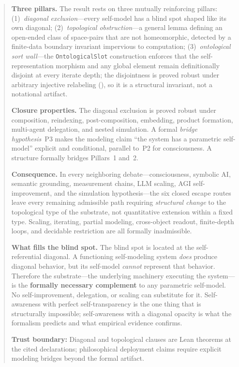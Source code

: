 \documentclass[11pt]{article}
\begin{document}
\begin{abstract}
\medskip
\noindent\textbf{Three pillars.}
The result rests on three mutually reinforcing pillars:
(1)~\emph{diagonal exclusion}---every self-model has a blind spot
shaped like its own diagonal;
(2)~\emph{topological obstruction}---a general lemma defining an
open-ended class of space-pairs that are not homeomorphic, detected by
a finite-data boundary invariant impervious to computation;
(3)~\emph{ontological sort wall}---the \texttt{OntologicalSlot}
construction enforces that the self-representation morphism and any
global element remain definitionally disjoint at every iterate depth;
the disjointness is proved robust under arbitrary injective relabeling
(), so it is a structural invariant, not a
notational artifact.

\medskip
\noindent\textbf{Closure properties.}
The diagonal exclusion is proved robust under composition,
reindexing, post-composition, embedding, product formation,
multi-agent delegation, and nested simulation.  A formal
\emph{bridge hypothesis}~P3 makes the modeling claim ``the system
has a parametric self-model'' explicit and conditional, parallel
to~P2 for consciousness.  A 
structure formally bridges Pillars~1 and~2.

\medskip
\noindent\textbf{Consequence.}
In every neighboring debate---consciousness, symbolic AI, semantic
grounding, measurement chains, LLM scaling, AGI self-improvement, and
the simulation hypothesis---the six closed escape routes
leave every remaining admissible path requiring \emph{structural change}
to the topological type of the substrate, not quantitative extension
within a fixed type.  Scaling, iterating, partial modeling, cross-object
readout, finite-depth loops, and decidable restriction are all formally
inadmissible.

\medskip
\noindent\textbf{What fills the blind spot.}
The blind spot is located at the self-referential diagonal.  A
functioning self-modeling system \emph{does} produce diagonal
behavior, but its self-model \emph{cannot} represent that behavior.
Therefore the substrate---the underlying machinery executing the
system---is the \textbf{formally necessary complement} to any
parametric self-model.  No self-improvement, delegation, or scaling
can substitute for it.  Self-awareness with perfect self-transparency
is the one thing that is structurally impossible; self-awareness with
a diagonal opacity is what the formalism predicts and what empirical
evidence confirms.

\medskip
\noindent\textbf{Trust boundary:} Diagonal and topological clauses are Lean theorems at the cited declarations; philosophical deployment claims require explicit modeling bridges beyond the formal artifact.

\NovaZenodoInAbstract
\end{abstract}
\end{document}
